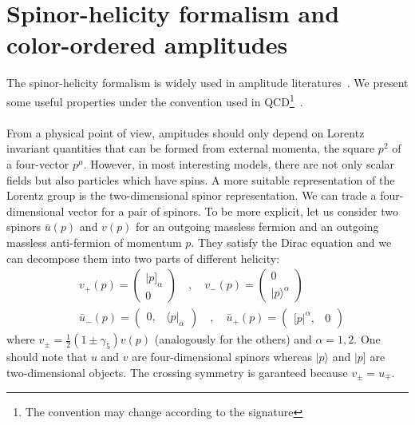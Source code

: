 \section{Spinor-helicity formalism and color-ordered amplitudes}\label{sect-spinor}
The spinor-helicity formalism is widely used in amplitude literatures~\cite{Dixon:1996wi,Elvang:2013cua}.
We present some useful properties under the convention used in QCD\footnote{The convention may change according to the signature}~\cite{Dixon:1996wi}.
\\\\
From a physical point of view, ampitudes should only depend on Lorentz invariant quantities that can be formed from external momenta, \eg the square $p^2$ of a four-vector $p^\mu$.
However, in most interesting models, there are not only scalar fields but also particles which have spins. 
A more suitable representation of the Lorentz group is the two-dimensional spinor representation.
We can trade a four-dimensional vector for a pair of spinors.
To be more explicit, let us consider two spinors $\bar{u}(p)$ and $v(p)$ for an outgoing massless fermion and an outgoing massless anti-fermion of momentum $p$.
They satisfy the Dirac equation and we can decompose them into two parts of different helicity:
\begin{equation}
\begin{split}
& v_+(p) = \begin{pmatrix}
|p]_\alpha \\ 0
\end{pmatrix} %
\quad,\quad
v_-(p) = \begin{pmatrix}
0 \\ |p\rangle^{\dot{\alpha}}
\end{pmatrix} %
\\
& \bar{u}_-(p) = \begin{pmatrix} 
0, & \langle p |_{\dot{\alpha}}\end{pmatrix}
\quad,\quad
\bar{u}_+(p) = \begin{pmatrix} [ p|^\alpha, & 0 \end{pmatrix}
\end{split}
\end{equation} 
where $v_\pm = \frac{1}{2}(1\pm\gamma_5)v(p)$ (analogously for the others) and $\alpha = 1,2$.
One should note that $u$ and $v$ are four-dimensional spinors whereas $|p\rangle$ and $|p]$ are two-dimensional objects. 
The crossing symmetry is garanteed because $v_\pm = u_\mp$.
\\
